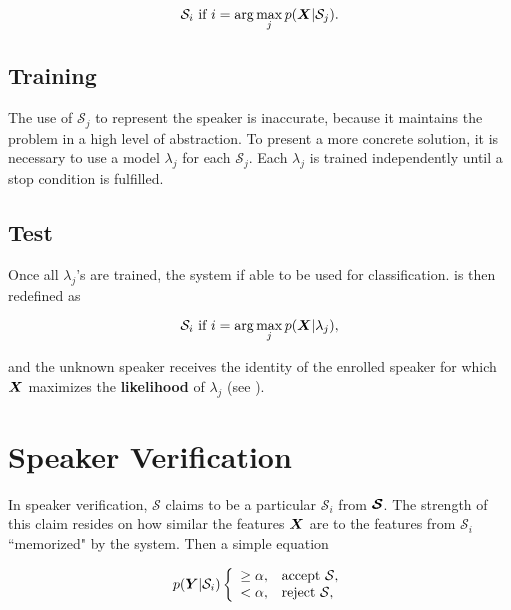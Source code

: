 \begin{equation}
    \mathcal{S}_i \text{ if } i = \arg\max_j \postpdf{\dvec{X}}{\mathcal{S}_j}.
    \label{eq:decision_speaker_identification_2}
\end{equation}

\subsection{Training}

The use of $\mathcal{S}_j$ to represent the speaker is inaccurate, because it maintains the problem in a high level of abstraction. To present a more concrete solution, it is necessary to use a model $\lambda_j$ for each $\mathcal{S}_j$. Each $\lambda_j$ is trained independently until a stop condition is fulfilled.

\subsection{Test}

Once all $\lambda_j$'s are trained, the system if able to be used for classification.  is then redefined as

\begin{equation}
    \mathcal{S}_i \text{ if } i = \arg\max_j \postpdf{\dvec{X}}{\lambda_j},
    \label{eq:decision_speaker_identification_3}
\end{equation}

\noindent and the unknown speaker receives the identity of the enrolled speaker for which $\boldsymbol{X}$ maximizes the \textbf{likelihood} of $\lambda_j$ (see ).

\section{Speaker Verification}
\label{sec:speaker-verification}

In speaker verification, $\mathcal{S}$ claims to be a particular $\mathcal{S}_i$ from $\boldsymbol{\mathcal{S}}$. The strength of this claim resides on how similar the features $\boldsymbol{X}$ are to the features from $\mathcal{S}_i$ ``memorized" by the system. Then a simple equation

\begin{equation}
    \postpdf{\boldsymbol{Y}}{\mathcal{S}_i} \verifytestB{\alpha}{\mathcal{S}}
    \label{eq:decision_speaker_verification}
\end{equation}

